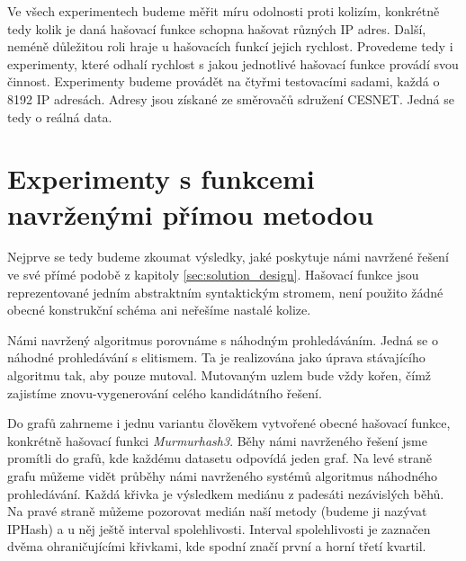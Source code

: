 Ve všech experimentech budeme měřit míru odolnosti proti kolizím, konkrétně tedy kolik je daná hašovací 
funkce schopna hašovat různých IP adres. Další, neméně důležitou roli hraje u hašovacích funkcí jejich
rychlost. Provedeme tedy i experimenty, které odhalí rychlost s jakou jednotlivé hašovací funkce provádí svou
činnost. Experimenty budeme provádět na čtyřmi testovacími sadami, každá o 8192 IP adresách. Adresy jsou
získané ze směrovačů sdružení CESNET. Jedná se tedy o reálná data.

\section{Experimenty s funkcemi navrženými přímou metodou}
Nejprve se tedy budeme zkoumat výsledky, jaké poskytuje námi navržené řešení ve své přímé podobě z kapitoly
\ref{sec:solution_design}. Hašovací funkce jsou reprezentované jedním abstraktním syntaktickým stromem, není
použito žádné obecné konstrukční schéma ani neřešíme nastalé kolize.
 
Námi navržený algoritmus porovnáme s náhodným prohledáváním.
Jedná se o náhodné prohledávání s elitismem. Ta je realizována jako úprava stávajícího algoritmu tak, aby pouze mutoval.
Mutovaným uzlem bude vždy kořen, čímž zajistíme znovu-vygenerování celého kandidátního řešení.
 
Do grafů zahrneme i jednu variantu člověkem vytvořené obecné hašovací funkce, konkrétně hašovací funkci
\textit{Murmurhash3}. Běhy námi navrženého řešení jsme promítli do grafů, kde každému
datasetu odpovídá jeden graf. Na levé straně grafu můžeme vidět průběhy námi navrženého systémů
algoritmus náhodného prohledávání. Každá křivka je výsledkem mediánu z padesáti nezávislých běhů. Na pravé
straně můžeme pozorovat medián naší metody (budeme ji nazývat IPHash) a u něj ještě interval spolehlivosti.
Interval spolehlivosti je zaznačen dvěma ohraničujícími křivkami, kde spodní značí první a horní třetí kvartil.

